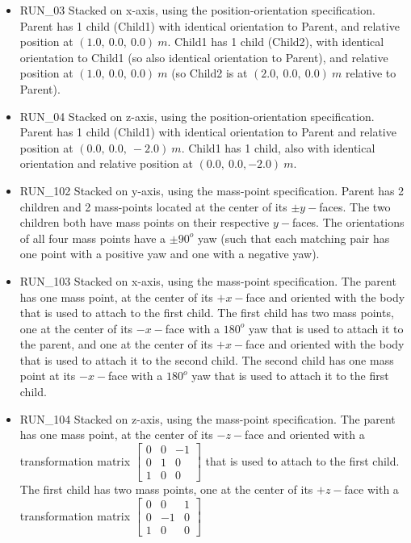 \begin{description}
\begin{itemize}
 \item RUN\_03 Stacked on x-axis, using the position-orientation
 specification.  Parent
 has 1 child (Child1) with identical orientation to Parent, and relative
 position at $(1.0,~0.0,~0.0)~m$.
 Child1 has 1 child (Child2), with identical orientation to Child1 (so also
 identical orientation to Parent), and relative position at
 $(1.0,~0.0,~0.0)~m$ (so Child2 is at $(2.0,~0.0,~0.0)~m$ relative to Parent).
 \item RUN\_04 Stacked on z-axis, using the position-orientation
 specification. Parent
 has 1 child (Child1) with identical orientation to Parent and relative
 position at $(0.0,~0.0,~-2.0)~m$.
 Child1 has 1 child, also with identical orientation and relative position at
 $(0.0,~0.0,-2.0)~m$.
 \item RUN\_102 Stacked on y-axis, using the mass-point specification.
 Parent has 2
 children and 2 mass-points located at the center of its $\pm y-$faces.  The
 two children both have mass points on their respective $y-$faces.  The
 orientations of all four mass points have a $\pm 90^o$ yaw (such that each
 matching pair has one point with a positive yaw and one with a negative yaw).
 \item RUN\_103 Stacked on x-axis, using the mass-point specification.
 The parent has
 one mass point, at the center of its $+x-$face and oriented with the body
 that is used to attach to the first child.  The first child has two mass
 points, one at the center of its $-x-$face with a $180^o$ yaw that is used
 to attach it to the parent, and one at the center of its $+x-$face and
 oriented with the body that is used to attach it to the second child.  The
 second child has one mass point at its $-x-$face with a $180^o$ yaw that is
 used to attach it to the first child.
 \item RUN\_104 Stacked on z-axis, using the mass-point specification.
 The parent has
 one mass point, at the center of its $-z-$face and oriented with a
 transformation matrix $\begin{bmatrix} 0 & 0 & -1 \\ 0 & 1 & 0 \\ 1 & 0 & 0
 \end{bmatrix}$ that is used to attach to the first child.  The first child
 has two mass points, one at the center of its $+z-$face with a transformation
 matrix $\begin{bmatrix} 0 & 0 & 1 \\ 0 & -1 & 0 \\ 1 & 0 & 0 \end{bmatrix}$

\end{itemize}
\end{description}
